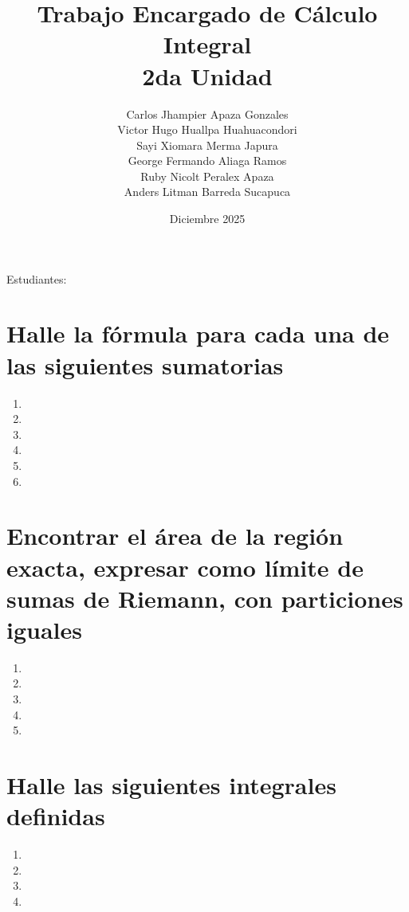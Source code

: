 \documentclass[11pt]{article}
\title{Trabajo Encargado de Cálculo Integral\\2da Unidad}
\author{Carlos Jhampier Apaza Gonzales\\
Victor Hugo Huallpa Huahuacondori\\
Sayi Xiomara Merma Japura\\
George Fermando Aliaga Ramos\\
Ruby Nicolt Peralex Apaza\\
Anders Litman Barreda Sucapuca}
\date{Diciembre 2025}
\begin{document}
\begin{titlepage}
    \centering
    {\Huge\bfseries \thetitle\par}
    \vspace{1cm}
    {\Large Estudiantes:\par}
    \vspace{0.5cm}
    {\large \theauthor\par}
    \vfill
    {\large \thedate\par}
\end{titlepage}

\section{Halle la fórmula para cada una de las siguientes sumatorias}
\begin{enumerate}[label=\textbf{\arabic*.}]
    \item 
    \item 
    \item 
    \item 
    \item 
    \item 
\end{enumerate}

\section{Encontrar el área de la región exacta, expresar como límite de sumas de Riemann, con particiones iguales}
\begin{enumerate}[resume,label=\textbf{\arabic*.}]
    \item 
    \item 
    \item 
    \item 
    \item 
\end{enumerate}

\section{Halle las siguientes integrales definidas}
\begin{enumerate}[resume,label=\textbf{\arabic*.}]
    \item 
    \item 
    \item 
    \item 
\end{enumerate}
\end{document}
